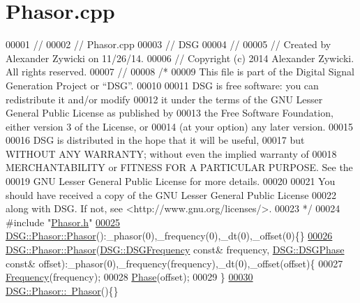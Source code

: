 \hypertarget{_phasor_8cpp_source}{\section{Phasor.\+cpp}
\label{_phasor_8cpp_source}
}

\begin{DoxyCode}
00001 \textcolor{comment}{//}
00002 \textcolor{comment}{//  Phasor.cpp}
00003 \textcolor{comment}{//  DSG}
00004 \textcolor{comment}{//}
00005 \textcolor{comment}{//  Created by Alexander Zywicki on 11/26/14.}
00006 \textcolor{comment}{//  Copyright (c) 2014 Alexander Zywicki. All rights reserved.}
00007 \textcolor{comment}{//}
00008 \textcolor{comment}{/*}
00009 \textcolor{comment}{ This file is part of the Digital Signal Generation Project or “DSG”.}
00010 \textcolor{comment}{}
00011 \textcolor{comment}{ DSG is free software: you can redistribute it and/or modify}
00012 \textcolor{comment}{ it under the terms of the GNU Lesser General Public License as published by}
00013 \textcolor{comment}{ the Free Software Foundation, either version 3 of the License, or}
00014 \textcolor{comment}{ (at your option) any later version.}
00015 \textcolor{comment}{}
00016 \textcolor{comment}{ DSG is distributed in the hope that it will be useful,}
00017 \textcolor{comment}{ but WITHOUT ANY WARRANTY; without even the implied warranty of}
00018 \textcolor{comment}{ MERCHANTABILITY or FITNESS FOR A PARTICULAR PURPOSE.  See the}
00019 \textcolor{comment}{ GNU Lesser General Public License for more details.}
00020 \textcolor{comment}{}
00021 \textcolor{comment}{ You should have received a copy of the GNU Lesser General Public License}
00022 \textcolor{comment}{ along with DSG.  If not, see <http://www.gnu.org/licenses/>.}
00023 \textcolor{comment}{ */}
00024 \textcolor{preprocessor}{#include "\hyperlink{_phasor_8h}{Phasor.h}"}
\hypertarget{_phasor_8cpp_source_l00025}{}\hyperlink{class_d_s_g_1_1_phasor_adc6b13ffdb208286a689a5aeab0fb342}{00025} \hyperlink{class_d_s_g_1_1_phasor_adc6b13ffdb208286a689a5aeab0fb342}{DSG::Phasor::Phasor}():\_phasor(0),\_frequency(0),\_dt(0),\_offset(0)\{\}
\hypertarget{_phasor_8cpp_source_l00026}{}\hyperlink{class_d_s_g_1_1_phasor_a34511b38200e71b6d3bb95872da91dbd}{00026} \hyperlink{class_d_s_g_1_1_phasor_adc6b13ffdb208286a689a5aeab0fb342}{DSG::Phasor::Phasor}(\hyperlink{namespace_d_s_g_a4315a061386fa1014fda09b15d3a6973}{DSG::DSGFrequency} \textcolor{keyword}{const}& frequency, 
      \hyperlink{namespace_d_s_g_a44431ce1eb0a7300efdd207bc879e52c}{DSG::DSGPhase} \textcolor{keyword}{const}& offset):\_phasor(0),\_frequency(frequency),\_dt(0),\_offset(offset)\{
00027     \hyperlink{class_d_s_g_1_1_phasor_a6bdec1d2722e2fa5c7173ac5f7adf682}{Frequency}(frequency);
00028     \hyperlink{class_d_s_g_1_1_phasor_af8eb0ff79a11ae02186505ff6ac085dd}{Phase}(offset);
00029 \}
\hypertarget{_phasor_8cpp_source_l00030}{}\hyperlink{class_d_s_g_1_1_phasor_a37b72afd6bd58cebf10cc937e73ef094}{00030} \hyperlink{class_d_s_g_1_1_phasor_a37b72afd6bd58cebf10cc937e73ef094}{DSG::Phasor::~Phasor}()\{\}
\end{DoxyCode}

